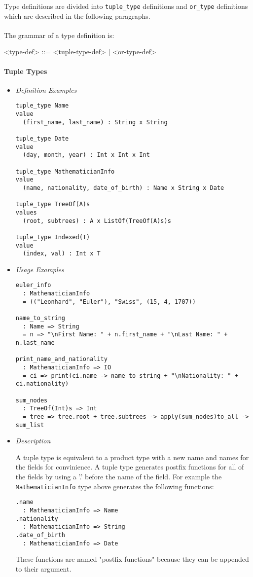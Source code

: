 \documentclass{article}
\begin{document}
Type definitions are divided into \texttt{tuple_type} definitions and
\texttt{or_type} definitions which are described in the following paragraphs.
\\\\
The grammar of a type definition is:
\begin{grammar}
<type-def> ::= <tuple-type-def> | <or-type-def>
\end{grammar}

\paragraph{Tuple Types}

\begin{itemize}
\item \textit{Definition Examples}

\begin{verbatim}
tuple_type Name
value
  (first_name, last_name) : String x String

tuple_type Date
value
  (day, month, year) : Int x Int x Int

tuple_type MathematicianInfo
value
  (name, nationality, date_of_birth) : Name x String x Date

tuple_type TreeOf(A)s
values
  (root, subtrees) : A x ListOf(TreeOf(A)s)s

tuple_type Indexed(T)
value
  (index, val) : Int x T
\end{verbatim}

\item \textit{Usage Examples}

\begin{verbatim}
euler_info
  : MathematicianInfo
  = (("Leonhard", "Euler"), "Swiss", (15, 4, 1707))

name_to_string
  : Name => String
  = n => "\nFirst Name: " + n.first_name + "\nLast Name: " + n.last_name

print_name_and_nationality
  : MathematicianInfo => IO
  = ci => print(ci.name -> name_to_string + "\nNationality: " + ci.nationality)

sum_nodes
  : TreeOf(Int)s => Int
  = tree => tree.root + tree.subtrees -> apply(sum_nodes)to_all -> sum_list
\end{verbatim}

\item \textit{Description}

A tuple type is equivalent to a product type with a new name  and names for the
fields for convinience. A tuple type generates postfix functions for all of
the fields by using a '.' before the name of the field. For example the
\texttt{MathematicianInfo} type above generates the following functions:
\begin{verbatim}
.name
  : MathematicianInfo => Name
.nationality
  : MathematicianInfo => String
.date_of_birth
  : MathematicianInfo => Date
\end{verbatim}
These functions are named "postfix functions" because they can be appended to
their argument.


\end{itemize}
\end{document}
